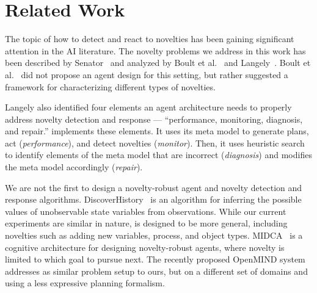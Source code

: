 \documentclass{article}
\begin{document}





\section{Related Work}

The topic of how to detect and react to novelties has been gaining significant attention in the AI literature. 
The novelty problems we address in this work has been described by Senator~\cite{senator2019sailon} 
and analyzed by Boult et al.~\cite{boult2021towards}
and Langely~\cite{langley2020open}. 
Boult et al.~\cite{boult2021towards,langley2020open} did not propose an agent design for this setting, but rather suggested a framework for characterizing different types of novelties. 


Langely also identified four elements an agent architecture needs to properly address novelty detection and response --- ``performance, monitoring, diagnosis, and repair.'' 
\hydra implements these elements. 
It uses its meta model to generate plans, act (\emph{performance}), and detect novelties (\emph{monitor}). 
Then, it uses heuristic search to identify elements of the meta model that are incorrect (\emph{diagnosis}) and modifies the meta model accordingly (\emph{repair}). 

We are not the first to design a novelty-robust agent and novelty detection and response algorithms. DiscoverHistory~\cite{molineaux2012discoverhistory} is an algorithm for inferring the possible values of unobservable state variables from observations. While our current experiments are similar in nature, \hydra is designed to be more general, including novelties such as adding new variables, process, and object types. MIDCA~\cite{paisner2014goal} is a cognitive architecture for designing novelty-robust agents, where novelty is limited to which goal to pursue next. The recently proposed OpenMIND system~\cite{musliner2021openmind} addresses as similar problem setup to ours, but on a different set of domains and using a less expressive planning formalism. 


\end{document}
